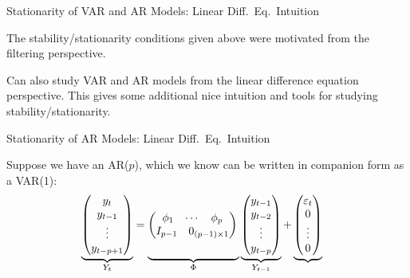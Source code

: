 \documentclass[aspectratio=169, handout]{beamer}
\begin{document}
{\footnotesize
\begin{frame}{%
    Stationarity of VAR and AR Models: Linear Diff.\ Eq.\ Intuition
}

The stability/stationarity conditions given above were motivated from
the \alert{filtering} perspective.


Can also study VAR and AR models from the
\alert{linear difference equation} perspective.
This gives some additional nice intuition and tools for studying
stability/stationarity.
\end{frame}
}



{\scriptsize
\begin{frame}{%
    Stationarity of AR Models: Linear Diff.\ Eq.\ Intuition
}

Suppose we have an AR($p$), which we know can be written in
\alert{companion form} as a VAR(1):
\begin{align*}
  \underbrace{%
  \begin{pmatrix}
    y_t \\ y_{t-1} \\ \vdots \\ y_{t-p+1}
  \end{pmatrix}
  }_{Y_t}
  &=
  \underbrace{%
  \begin{pmatrix}
    \begin{matrix}
      \phi_1 & \cdots & \phi_p
    \end{matrix}
    \\
    \begin{matrix}
      I_{p-1} & 0_{(p-1)\times 1}
    \end{matrix}
  \end{pmatrix}
  \vphantom{%
    \begin{pmatrix}
      y_{t-1} \\ y_{t-2} \\ \vdots \\ y_{t-p}
    \end{pmatrix}
  }
  }_{\Phi}
  \underbrace{%
  \begin{pmatrix}
    y_{t-1} \\ y_{t-2} \\ \vdots \\ y_{t-p}
  \end{pmatrix}
  }_{Y_{t-1}}
  +
  \underbrace{%
  \begin{pmatrix}
    \varepsilon_{t} \\ 0 \\ \vdots \\ 0

\end{pmatrix}}
\end{align*}
\end{frame}}
\end{document}
